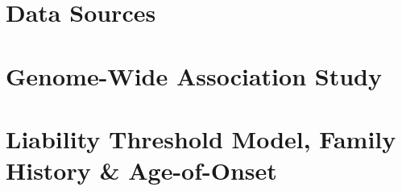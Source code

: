 \section{Data Sources}



\section{Genome-Wide Association Study}\label{sec:GWAS}


%
\newpage
\section{Liability Threshold Model, Family History \& Age-of-Onset} \label{sec:methods:LTMs}








